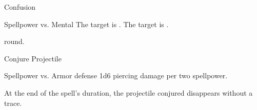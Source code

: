 \begin{spellsection}[Lesser]{Confusion}
    \begin{spellheader}
    \end{spellheader}
    \begin{spellcontent}
        \begin{spelltargetinginfo}
        \end{spelltargetinginfo}
        \begin{spelleffects}
            \begin{spellattack}{Spellpower vs. Mental}
                \spellsuccess The target is \disoriented.
                \spellcritical The target is \confused.
            \end{spellattack}
             round.
        \end{spelleffects}
    \end{spellcontent}
    \begin{spellfooter}
        \spellnotes \norepeatspellnotes
    \end{spellfooter}
\end{spellsection}

\begin{spellsection}{Conjure Projectile}
    \begin{spellheader}
    \end{spellheader}
    \begin{spellcontent}
        \begin{spelltargetinginfo}
        \end{spelltargetinginfo}
        \begin{spelleffects}
            \begin{spellattack}{Spellpower vs. Armor defense}
                \spellsuccess 1d6 piercing damage  per two spellpower.
            \end{spellattack}
        \end{spelleffects}
    \end{spellcontent}
    \begin{spellfooter}
        \spellnotes At the end of the spell's duration, the projectile conjured disappears without a trace.

        \physicalspellnotes
    \end{spellfooter}
\end{spellsection}

